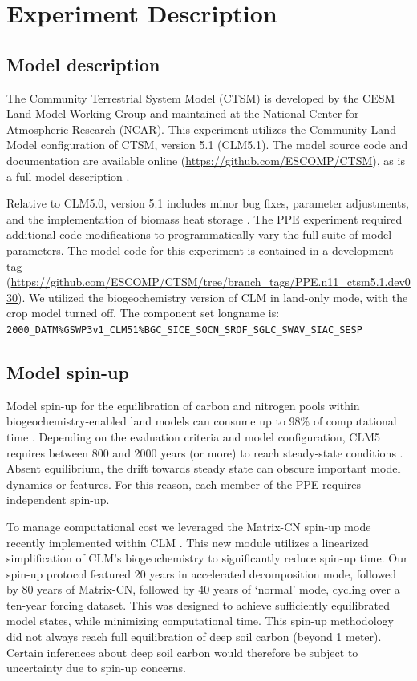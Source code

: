 \documentclass[draft]{agujournal2019}
\begin{document}
\section{Experiment Description}
\label{methods}
\subsection{Model description}
\label{sect:md}
The Community Terrestrial System Model (CTSM) is developed by the CESM Land Model Working Group and maintained at the National Center for Atmospheric Research (NCAR). This experiment utilizes the Community Land Model configuration of CTSM, version 5.1 (CLM5.1). The model source code and documentation are available online (\url{https://github.com/ESCOMP/CTSM}), as is a full model description \cite{lawrence2019}.

Relative to CLM5.0, version 5.1 includes minor bug fixes, parameter adjustments, and the implementation of biomass heat storage \cite{swenson2019}. The PPE experiment required additional code modifications to programmatically vary the full suite of model parameters. The model code for this experiment is contained in a development tag (\url{https://github.com/ESCOMP/CTSM/tree/branch_tags/PPE.n11_ctsm5.1.dev030}). We utilized the biogeochemistry version of CLM in land-only mode, with the crop model turned off. The component set longname is: \\ \texttt{2000\_DATM\%GSWP3v1\_CLM51\%BGC\_SICE\_SOCN\_SROF\_SGLC\_SWAV\_SIAC\_SESP}

\subsection{Model spin-up}
\label{sect:mcn}
Model spin-up for the equilibration of carbon and nitrogen pools within biogeochemistry-enabled land models can consume up to 98\% of computational time \cite{sun2023}. Depending on the evaluation criteria and model configuration, CLM5 requires between 800 and 2000 years (or more) to reach steady-state conditions \cite{lawrence2019}. Absent equilibrium, the drift towards steady state can obscure important model dynamics or features. For this reason, each member of the PPE requires independent spin-up.

To manage computational cost we leveraged the Matrix-CN spin-up mode recently implemented within CLM \cite{lu2020}. This new module utilizes a linearized simplification of CLM's biogeochemistry to significantly reduce spin-up time. Our spin-up protocol featured 20 years in accelerated decomposition mode, followed by 80 years of Matrix-CN, followed by 40 years of `normal' mode, cycling over a ten-year forcing dataset. This was designed to achieve sufficiently equilibrated model states, while minimizing computational time. This spin-up methodology did not always reach full equilibration of deep soil carbon (beyond 1 meter). Certain inferences about deep soil carbon would therefore be subject to uncertainty due to spin-up concerns.
\end{document}
